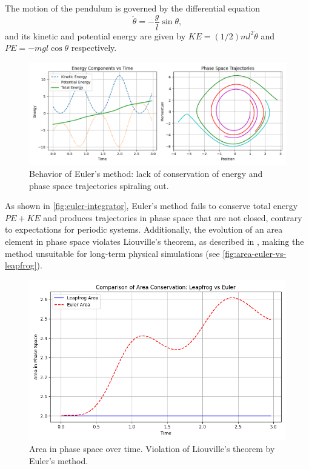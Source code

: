 The motion of the pendulum is governed by the differential equation
\begin{equation*}
    \ddot{\theta} = -\frac{g}{l}\sin\theta,
\end{equation*}
and its kinetic and potential energy are given by $KE = (1/2)ml^2\dot{\theta}$ and $PE = -mgl\cos\theta$ respectively.
\begin{figure}[htp]
    \centering
    \includegraphics[scale=0.6]{img/integrators/euler-pendulum.png}
    \caption{Behavior of Euler's method: lack of conservation of energy and phase space trajectories spiraling out.}
    \label{fig:euler-integrator}
\end{figure}
As shown in \autoref{fig:euler-integrator}, Euler's method fails to conserve total energy $PE + KE$ and produces trajectories in phase space that are not closed, contrary to expectations for periodic systems.
Additionally, the evolution of an area element in phase space violates Liouville's theorem, as described in \cite{taylor2005classical}, making the method unsuitable for long-term physical simulations (see \autoref{fig:area-euler-vs-leapfrog}).
\begin{figure}[htp]
    \centering
    \includegraphics[scale=0.4]{img/integrators/area-leap-vs-euler.png}
    \caption{Area in phase space over time. Violation of Liouville's theorem by Euler's method.}
    \label{fig:area-euler-vs-leapfrog}
\end{figure}

